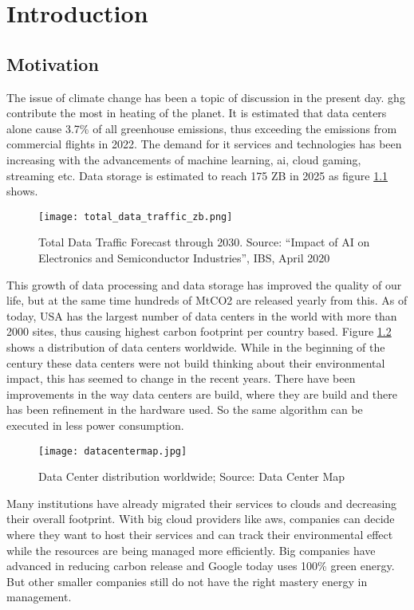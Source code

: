 \documentclass[
  a4paper,  %
  twoside,  %
  bibliography=totoc,
  headsepline,
  cleardoublepage=empty,
  parskip=half,
  draft=false
]{scrbook}
\begin{document}
%
%


\chapter{Introduction}
\section{Motivation}
The issue of climate change has been a topic of discussion in the present day. \gls{ghg} contribute the most in heating of the planet. It is estimated that data centers alone cause 3.7\% of all greenhouse emissions, thus exceeding the emissions from commercial flights in 2022. The demand for \gls{it} services and technologies has been increasing with the advancements of machine learning, \gls{ai}, cloud gaming, streaming etc. Data storage is estimated to reach 175 ZB in 2025\cite{zhou2021role} as figure \ref{total_data_traffic} shows. 
\begin{figure}
	\centering
	\texttt{[image: total\_data\_traffic\_zb.png]}
	\caption{Total Data Traffic Forecast through 2030. Source: “Impact of AI on Electronics and Semiconductor Industries”, IBS, April 2020}
	\label{total_data_traffic}
\end{figure}
This growth of data processing and data storage has improved the quality of our life, but at the same time hundreds of MtCO2 are released yearly from this. As of today, USA has the largest number of data centers in the world with more than 2000 sites, thus causing highest carbon footprint per country based. Figure \ref{datacentermap} shows a distribution of data centers worldwide. While in the beginning of the century these data centers were not build thinking about their environmental impact, this has seemed to change in the recent years. There have been improvements in the way data centers are build, where they are build and there has been refinement in the hardware used. So the same algorithm can be executed in less power consumption. 
\begin{figure}
	\centering
	\texttt{[image: datacentermap.jpg]}
	\caption{Data Center distribution worldwide; Source: Data Center Map \cite{datacentermapDataCenters}}
	\label{datacentermap}
\end{figure}
Many institutions have already migrated their services to clouds and decreasing their overall footprint. With big cloud providers like \gls{aws}, companies can decide where they want to host their services and can track their environmental effect while the resources are being managed more efficiently. Big companies have advanced in reducing carbon release and Google today uses 100\% green energy\cite{blogAccelerateAdvanced}. But other smaller companies still do not have the right mastery energy in  management. 
\end{document}
